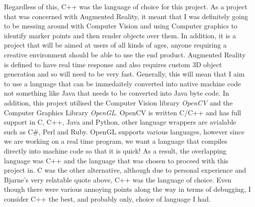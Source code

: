 \documentclass[11pt]{article}
\begin{document}
Regardless of this, C++ was the language of choice for this project.
As a project that was concerned with Augmented Reality, it meant that I was
definitely going to be messing around with Computer Vision and using 
Computer graphics to identify marker points and then render objects over them.
In addition, it is a project that will be aimed at users of all kinds of ages,
anyone requiring a creative environment should be able to use the end product.
Augmented Reality is defined to have real time response and also requires custom 3D 
object generation and so will need to be very fast. Generally, this will mean
that I aim to use a language that can be immedaitely converted into native
machine code not something like Java that needs to be converted into Java byte code.
In addition, this project utilised the Computer Vision library
\textit{OpenCV} and the Computer Graphics Library \textit{OpenGL}. OpenCV is written 
C/C++ and has full support in C, C++, Java and Python, other language wrappers are
avialable such as C\#, Perl and Ruby. OpenGL supports various languages, however
since we are working on a real time program, we want a language that compiles
directly into machine code so that it is quick! As a result, the overlapping
language was C++ and the language that was chosen to proceed with this project in.
C was the other alternative, although due to personal experience and Bjarne's
very relatable quote above, C++ was the language of choice. Even though there
were various annoying points along the way in terms of debugging, I consider
C++ the best, and probably only, choice of language I had.
\end{document}
